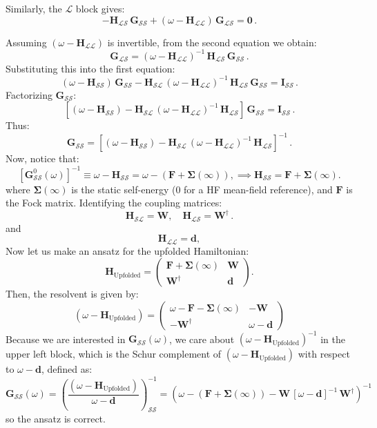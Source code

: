 Similarly, the $\mathcal{L}$ block gives:
\begin{equation}
-\bm{H}_{\mathcal{LS}}\,\bm{G}_{\mathcal{SS}} + (\omega - \bm{H}_{\mathcal{LL}})\,\bm{G}_{\mathcal{LS}} = \bm{0}\,.
\end{equation}

Assuming $(\omega - \bm{H}_{\mathcal{LL}})$ is invertible, from the second equation we obtain:
\[
\bm{G}_{\mathcal{LS}} = (\omega - \bm{H}_{\mathcal{LL}})^{-1}\,\bm{H}_{\mathcal{LS}}\,\bm{G}_{\mathcal{SS}}\,.
\]
Substituting this into the first equation:
\[
(\omega - \bm{H}_{\mathcal{SS}})\,\bm{G}_{\mathcal{SS}} - \bm{H}_{\mathcal{SL}}\,(\omega - \bm{H}_{\mathcal{LL}})^{-1}\,\bm{H}_{\mathcal{LS}}\,\bm{G}_{\mathcal{SS}} = \bm{I}_{\mathcal{SS}}\,.
\]
Factorizing $\bm{G}_{\mathcal{SS}}$:
\[
\left[(\omega - \bm{H}_{\mathcal{SS}}) - \bm{H}_{\mathcal{SL}}\,(\omega - \bm{H}_{\mathcal{LL}})^{-1}\,\bm{H}_{\mathcal{LS}}\right]\,\bm{G}_{\mathcal{SS}} = \bm{I}_{\mathcal{SS}}\,.
\]
Thus:
\[
\bm{G}_{\mathcal{SS}} = \left[(\omega - \bm{H}_{\mathcal{SS}}) - \bm{H}_{\mathcal{SL}}\,(\omega - \bm{H}_{\mathcal{LL}})^{-1}\,\bm{H}_{\mathcal{LS}}\right]^{-1}\,.
\]
Now, notice that:
\[
[\bm{G}_{\mathcal{SS}}^0(\omega)]^{-1} \equiv \omega - \bm{H}_{\mathcal{SS}} = \omega - (\bm{F} + \bm{\Sigma}(\infty)),
\implies \bm{H}_{\mathcal{SS}} = \bm{F} + \bm{\Sigma}(\infty).
\]
where $\bm{\Sigma}(\infty)$ is the static self-energy (0 for a HF mean-field reference), and $\bm{F}$ is the Fock matrix.
Identifying the coupling matrices:
\[
\bm{H}_{\mathcal{SL}} = \bm{W}, \quad \bm{H}_{\mathcal{LS}} = \bm{W}^{\dagger}\,.
\]
and
\[
\bm{H}_{\mathcal{LL}} = \bm{d},
\]
Now let us make an ansatz for the upfolded Hamiltonian:
\[
\bm{H}_{\text{Upfolded}} = \begin{pmatrix}
\bm{F} + \bm{\Sigma}(\infty) & \bm{W}\\
\bm{W}^{\dagger} & \bm{d}
\end{pmatrix}.
\]
Then, the resolvent is given by:
\begin{equation}
    \left(\omega - \bm{H}_{\text{Upfolded}}\right) = \begin{pmatrix}
    \omega - \bm{F} - \bm{\Sigma}(\infty) & -\bm{W}\\
    -\bm{W}^{\dagger} & \omega - \bm{d}
    \end{pmatrix}
\end{equation}
Because we are interested in $\bm{G}_{\mathcal{SS}}(\omega)$, we care about $\left(\omega - \bm{H}_{\text{Upfolded}}\right)^{-1}$ in the upper left block, which is the Schur complement of $\left(\omega - \bm{H}_{\text{Upfolded}}\right)$ with respect to $\omega - \bm{d}$, defined as:
\begin{equation}
\bm{G}_{\mathcal{SS}}(\omega) = \left(\frac{\left(\omega - \bm{H}_{\text{Upfolded}}\right)}{\omega - \bm{d}}\right)^{-1}_{\mathcal{SS}} = \left(\omega - \left(\bm{F} + \bm{\Sigma}(\infty)\right) - \bm{W}\,[\omega - \bm{d}]^{-1}\,\bm{W}^{\dagger}\right)^{-1}
\end{equation}
so the ansatz is correct.
